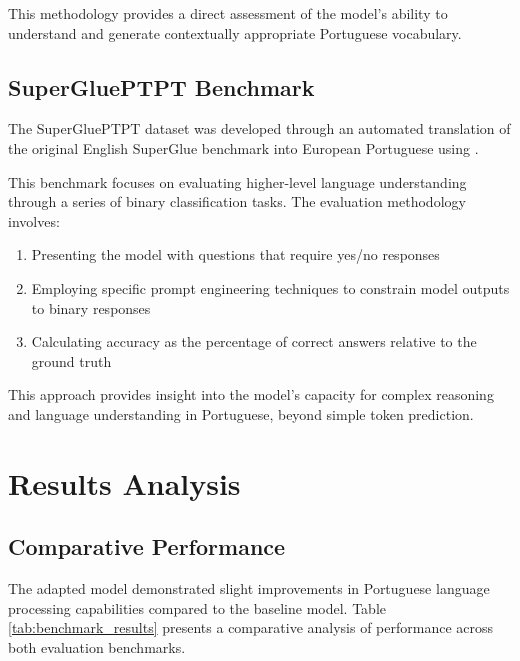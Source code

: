 This methodology provides a direct assessment of the model's ability to understand and generate contextually appropriate Portuguese vocabulary.

\subsection{SuperGluePTPT Benchmark}
The SuperGluePTPT dataset was developed through an automated translation of the original English SuperGlue benchmark \cite{https://proceedings.neurips.cc/paper/2019/hash/4496bf24afe7fab6f046bf4923da8de6-Abstract.html} into European Portuguese using \cite{DeepL}.

This benchmark focuses on evaluating higher-level language understanding through a series of binary classification tasks. The evaluation methodology involves:

\begin{enumerate}
    \item Presenting the model with questions that require yes/no responses
    \item Employing specific prompt engineering techniques to constrain model outputs to binary responses
    \item Calculating accuracy as the percentage of correct answers relative to the ground truth
\end{enumerate}

This approach provides insight into the model's capacity for complex reasoning and language understanding in Portuguese, beyond simple token prediction.

\section{Results Analysis}
\subsection{Comparative Performance}
The adapted model demonstrated slight improvements in Portuguese language processing capabilities compared to the baseline model. Table \ref{tab:benchmark_results} presents a comparative analysis of performance across both evaluation benchmarks.

